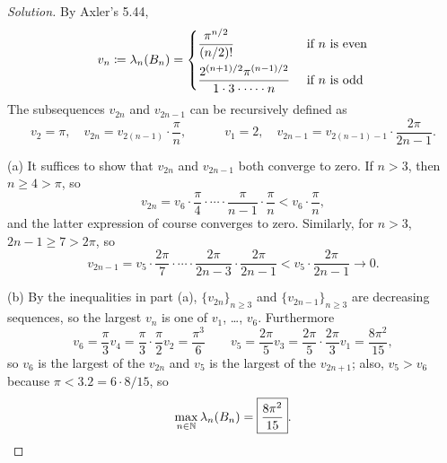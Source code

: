 \documentclass[10pt]{article}
\providecommand{\NN}{\mathbb N}
\newenvironment{soln}{\begin{proof}[Solution]}{\end{proof}}
\begin{document}
\begin{soln}
    By Axler's 5.44,
    \begin{equation*}
        v_n \coloneq \lambda_n(B_n) =
	\begin{dcases}
	    \frac{\pi^{n/2}}{(n/2)!} & \text{ if }n\text{ is even}\\
	    \frac{2^{(n+1)/2}\pi^{(n-1)/2}}{1\cdot 3\cdot\cdots\cdot n}
				     & \text{ if }n\text{ is odd}
	\end{dcases}
    \end{equation*}
    The subsequences $v_{2n}$ and $v_{2n-1}$ can be recursively defined as
    \begin{equation*}
	v_2 = \pi,\quad v_{2n} = v_{2(n-1)}\cdot \frac\pi n,\qquad\quad
	v_1 = 2,\quad v_{2n - 1} = v_{2(n-1) - 1}\cdot \frac{2\pi}{2n-1}.
    \end{equation*}

    (a) It suffices to show that $v_{2n}$ and $v_{2n-1}$
    both converge to zero. If $n > 3$, then $n\ge 4 > \pi$, so
    \begin{equation*}
	v_{2n} = v_6\cdot \frac\pi 4\cdot\cdots\cdot\frac\pi{n-1}\cdot\frac\pi n
	< v_6\cdot \frac\pi n,
    \end{equation*}
    and the latter expression of course converges to zero.
    Similarly, for $n > 3$, $2n - 1 \ge 7 > 2\pi$, so
    \begin{equation*}
	v_{2n-1} = v_5\cdot \frac{2\pi}{7}\cdot\cdots\cdot
	\frac{2\pi}{2n-3}\cdot\frac{2\pi}{2n-1} < v_5\cdot\frac{2\pi}{2n-1}\to 0.
    \end{equation*}

    (b) By the inequalities in part (a),
    $\{v_{2n}\}_{n\ge 3}$ and $\{v_{2n-1}\}_{n\ge3}$ are decreasing sequences,
    so the largest $v_n$ is one of $v_1$, \dots, $v_6$.
    Furthermore
    \begin{equation*}
        v_6 = \frac\pi 3 v_4 = \frac\pi 3 \cdot \frac\pi 2 v_2
	= \frac{\pi^3}{6}
	\qquad
	v_5 = \frac{2\pi}5 v_3 = \frac{2\pi}5 \cdot\frac{2\pi}3 v_1
	= \frac{8\pi^2}{15},
    \end{equation*}
    so $v_6$ is the largest of the $v_{2n}$
    and $v_5$ is the largest of the $v_{2n+1}$;
    also, $v_5 > v_6$ because $\pi < 3.2 = 6\cdot 8/15$, so
    \begin{equation*}
	\max_{n\in\NN}\lambda_n(B_n) = \boxed{\frac{8\pi^2}{15}}.\qedhere
    \end{equation*}
\end{soln}

\pagebreak
\end{document}
